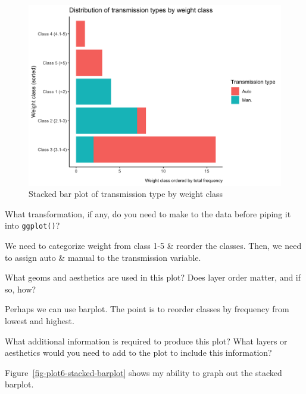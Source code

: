 \documentclass[
  man,
  floatsintext,
  longtable,
  nolmodern,
  notxfonts,
  notimes,
  colorlinks=true,linkcolor=blue,citecolor=blue,urlcolor=blue]{apa7}
\begin{document}
\begin{figure}[H]

\caption{Stacked bar plot of transmission type by weight class}

{\centering \includegraphics{plots/plot6.png}

}

\end{figure}%

What transformation, if any, do you need to make to the data before
piping it into \texttt{ggplot()}?

We need to categorize weight from class 1-5 \& reorder the classes.
Then, we need to assign auto \& manual to the transmission variable.

What geoms and aesthetics are used in this plot? Does layer order
matter, and if so, how?

Perhaps we can use barplot. The point is to reorder classes by frequency
from lowest and highest.

What additional information is required to produce this plot? What
layers or aesthetics would you need to add to the plot to include this
information?

Figure~\ref{fig-plot6-stacked-barplot} shows my ability to graph out the
stacked barplot.
\end{document}
